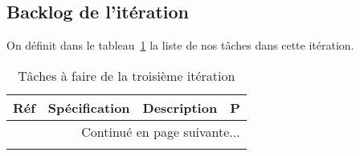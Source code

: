 \subsection{Backlog de l'itération}

On définit dans le tableau~\ref{tab:sprint3-backlog} la liste de nos tâches
dans cette itération.

\begin{center}
    \footnotesize
    \begin{longtable}{| p{1cm} | p{5cm} | p{7cm} | l |}
        \caption{Tâches à faire de la troisième itération}
\label{tab:sprint3-backlog} \\

 \hline
 \multicolumn{1}{|c}{\textbf{Réf}} &
 \multicolumn{1}{|c}{\textbf{Spécification}} &
 \multicolumn{1}{|c}{\textbf{Description}} &
 \multicolumn{1}{|c|}{\textbf{P}} \\ \hline
 \endhead

 \hline \multicolumn{4}{|r|}{{Continué en page suivante$\dotsc$}} \\ \hline
 \endfoot

 \hline \hline
 \endlastfoot


\end{longtable}
\end{center}
